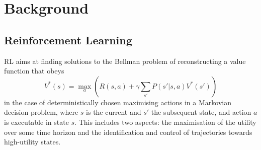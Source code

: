\documentclass{article}
\begin{document}

\section{Background}\label{background}

\subsection{Reinforcement Learning}

RL aims at finding solutions to the Bellman problem of reconstructing a value function that obeys
\begin{equation}
	V^*(s)=\max_a \left(R(s,a) + \gamma \sum_{s'} P(s'|s,a) V^*(s')\right)
\end{equation} 
in the case of deterministically chosen maximising actions in a Markovian decision problem, where
$s$ is the current and $s'$ the subsequent state, and action $a$ is executable in state $s$.
This includes two aspects: the maximisation of the utility over some time horizon and the 
identification and control of trajectories towards high-utility states. 
\end{document}
